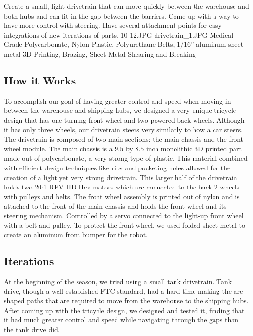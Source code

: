 {Create a small, light drivetrain that can move quickly between the warehouse and both hubs and can fit in the gap between the barriers. Come up with a way to have more control with steering. Have several attachment points for easy integrations of new iterations of parts.
} %
{10-12.JPG}%
{drivetrain_1.JPG}%
{Medical Grade Polycarbonate, Nylon Plastic, Polyurethane Belts, 1/16” aluminum sheet metal}%
{3D Printing, Brazing, Sheet Metal Shearing and Breaking}%

\subsection*{How it Works}
To accomplish our goal of having greater control and speed when moving in between the warehouse and shipping hubs, we designed a very unique tricycle design that has one turning front wheel and two powered back wheels. Although it has only three wheels,  our drivetrain steers very similarly to how a car steers. The drivetrain is composed of two main sections: the main chassis and the front wheel module. The main chassis is a 9.5 by 8.5 inch monolithic 3D printed part made out of polycarbonate, a very strong type of plastic. This material combined with efficient design techniques like ribs and pocketing holes allowed for the creation of a light yet very strong drivetrain. This larger half of the drivetrain holds two 20:1 REV HD Hex motors which are connected to the back 2 wheels with pulleys and belts. The front wheel assembly is printed out of nylon and is attached to the front of the main chassis and holds the front wheel and its steering mechanism. Controlled by a servo connected to the light-up front wheel with a belt and pulley. To protect the front wheel, we used folded sheet metal to create an aluminum front bumper for the robot.


\subsection*{Iterations}
At the beginning of the season, we tried using a small tank drivetrain. Tank drive, though a well established FTC standard, had a hard time making the arc shaped paths that are required to move from the warehouse to the shipping hubs. After coming up with the tricycle design, we designed and tested it, finding that it had much greater control and speed while navigating through the gaps than the tank drive did.

